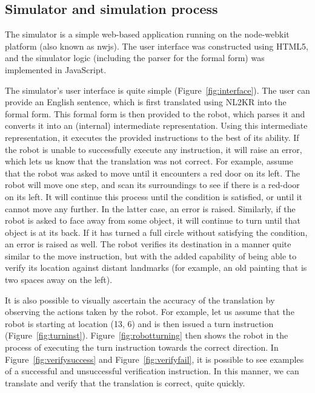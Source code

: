 \documentclass[11pt,letterpaper]{article}
\begin{document}
\subsection{Simulator and simulation process}

The simulator is a simple web-based application running on the node-webkit platform (also known as nwjs). The user interface was constructed using HTML5, and the simulator logic (including the parser for the formal form) was implemented in JavaScript. 

The simulator's user interface is quite simple (Figure~\ref{fig:interface}). The user can provide an English sentence, which is first translated using NL2KR into the formal form. This formal form is then provided to the robot, which parses it and converts it into an (internal) intermediate representation. Using this intermediate representation, it executes the provided instructions to the best of its ability. If the robot is unable to successfully execute any instruction, it will raise an error, which lets us know that the translation was not correct. For example, assume that the robot was asked to move until it encounters a red door on its left. The robot will move one step, and scan its surroundings to see if there is a red-door on its left. It will continue this process until the condition is satisfied, or until it cannot move any further. In the latter case, an error is raised. Similarly, if the robot is asked to face away from some object, it will continue to turn until that object is at its back. If it has turned a full circle without satisfying the condition, an error is raised as well. The robot verifies its destination in a manner quite similar to the move instruction, but with the added capability of being able to verify its location against distant landmarks (for example, an old painting that is two spaces away on the left). 

It is also possible to visually ascertain the accuracy of the translation by observing the actions taken by the robot. For example, let us assume that the robot is starting at location (13, 6) and is then issued a turn instruction (Figure~\ref{fig:turninst}). Figure~\ref{fig:robotturning} then shows the robot in the process of executing the turn instruction towards the correct direction. In Figure~\ref{fig:verifysuccess} and Figure~\ref{fig:verifyfail}, it is possible to see examples of a successful and unsuccessful verification instruction. In this manner, we can translate and verify that the translation is correct, quite quickly.
\end{document}
